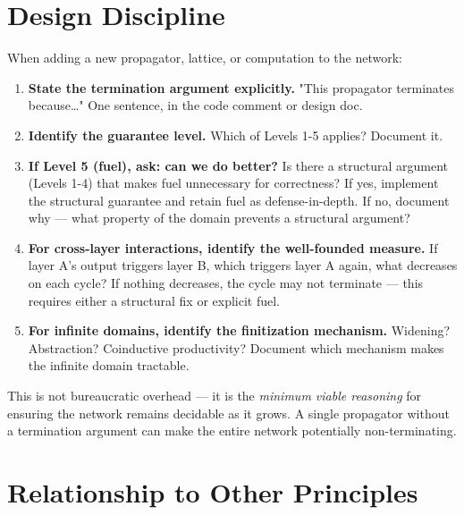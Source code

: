 \documentclass[11pt]{article}
\begin{document}
\section{Design Discipline}
\label{sec:org774b9a7}

When adding a new propagator, lattice, or computation to the network:

\begin{enumerate}
\item \textbf{State the termination argument explicitly.} "This propagator
terminates because\ldots{}" One sentence, in the code comment or
design doc.

\item \textbf{Identify the guarantee level.} Which of Levels 1-5 applies?
Document it.

\item \textbf{If Level 5 (fuel), ask: can we do better?} Is there a structural
argument (Levels 1-4) that makes fuel unnecessary for correctness?
If yes, implement the structural guarantee and retain fuel as
defense-in-depth. If no, document why --- what property of the
domain prevents a structural argument?

\item \textbf{For cross-layer interactions, identify the well-founded measure.}
If layer A's output triggers layer B, which triggers layer A
again, what decreases on each cycle? If nothing decreases,
the cycle may not terminate --- this requires either a structural
fix or explicit fuel.

\item \textbf{For infinite domains, identify the finitization mechanism.}
Widening? Abstraction? Coinductive productivity? Document
which mechanism makes the infinite domain tractable.
\end{enumerate}

This is not bureaucratic overhead --- it is the \emph{minimum viable
reasoning} for ensuring the network remains decidable as it grows.
A single propagator without a termination argument can make the
entire network potentially non-terminating.
\section{Relationship to Other Principles}
\label{sec:org30154ba}
\end{document}
